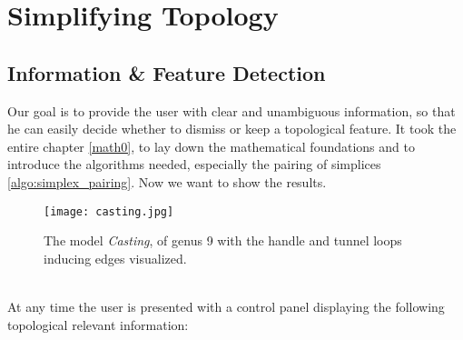 \newpage
\section{Simplifying Topology}
\label{topstoc2}

\subsection{Information \& Feature Detection}
\label{topstoc21}

Our goal is to provide the user with clear and unambiguous information, so that he can easily decide whether to dismiss or keep a topological feature.
It took the entire chapter \ref{math0}, to lay down the mathematical foundations and to introduce the algorithms needed, especially the pairing of simplices \ref{algo:simplex_pairing}.
Now we want to show the results.
\begin{figure}[ht]
\centering
\texttt{[image: casting.jpg]}
\caption{The model \textit{Casting}, of genus 9 with the handle and tunnel loops inducing edges visualized.}
\label{fig:casting}
\end{figure}\\
At any time the user is presented with a control panel displaying the following topological relevant information:
